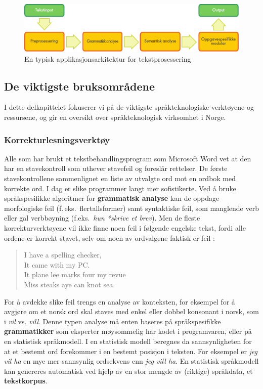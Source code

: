 \begin{multicols}{2}
\begin{figure}[htb]
  \center
  \includegraphics[width=\textwidth]{../_media/norwegian-bokmaal/text_processing_app_architecture}
  \caption{En typisk applikasjonsarkitektur for tekstprosessering}
  \label{fig:textprocessingarch_no}
\end{figure}

\subsection{De viktigste bruksområdene}

I dette delkapittelet fokuserer vi på de viktigste språkteknologiske verktøyene og ressursene, og gir en oversikt over språkteknologisk virksomhet i Norge. 

\subsubsection{Korrekturlesningsverktøy}

Alle som har brukt et tekstbehandlingsprogram som Microsoft Word vet at den har en stavekontroll som uthever stavefeil og foreslår rettelser. De første stavekontrollene  sammenlignet en liste av utvalgte ord mot en ordbok med korrekte ord. I dag er slike programmer langt mer sofistikerte. Ved å bruke språkspesifikke algoritmer for \textbf{grammatisk analyse} kan de oppdage morfologiske feil (f.\,eks.~flertallsformer) samt syntaktiske feil, som manglende verb eller gal verbbøyning (f.eks.~\textit{hun *skrive et brev}). Men de fleste korrekturverktøyene vil ikke finne noen feil i følgende engelske tekst, fordi alle ordene er korrekt stavet, selv om noen av ordvalgene faktisk er feil \cite{zar1}:
 
\begin{quote}
  I have a spelling checker,\\
  It came with my PC.\\
  It plane lee marks four my revue\\
  Miss steaks aye can knot sea.
\end{quote}

For å avdekke slike feil trengs en analyse av konteksten, for eksempel for å avgjøre om et norsk ord skal staves med enkel eller dobbel konsonant i norsk, som i \textit{vil} vs. \textit{vill}.
Denne typen analyse må enten baseres på språkspesifikke \textbf{grammatikker} som eksperter møysommelig har kodet i programvaren, eller på en statistisk språkmodell. 
I en statistisk modell beregnes da sannsynligheten for at et bestemt ord forekommer i en bestemt posisjon i teksten. For eksempel er \textit{jeg vil ha} en mye mer sannsynlig ordsekvens enn \textit{jeg vill ha}. En statistisk språkmodell kan genereres automatisk ved hjelp av en stor mengde av (riktige) språkdata, et \textbf{tekstkorpus}. 


\end{multicols}
